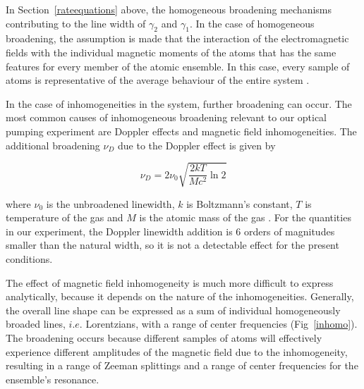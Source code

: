 In Section~\ref{rateequations} above, the homogeneous broadening
mechanisms contributing to the line width of $\gamma_2$ and
$\gamma_1$. In the case of homogeneous broadening, the assumption is
made that the interaction of the electromagnetic fields with the
individual magnetic moments of the atoms that has the same features
for every member of the atomic ensemble. In this case, every sample of
atoms is representative of the average behaviour of the entire system
\cite{vanier}. 

In the case of inhomogeneities in the system, further broadening can
occur. The most common causes of inhomogeneous broadening relevant to
our optical pumping experiment are Doppler effects and magnetic field
inhomogeneities. The additional broadening $\nu_D$ due to the Doppler effect
is given by

\begin{equation}
\nu_D = 2\nu_0\sqrt{\frac{2 k T}{M c^2}\ln{2}}
\end{equation}

where $\nu_0$ is the unbroadened linewidth, $k$ is Boltzmann's
constant, $T$ is temperature of the gas and $M$ is the atomic mass of
the gas \cite{yariv}. For the quantities in our experiment, the
Doppler linewidth addition is $6$ orders of magnitudes smaller than
the natural width, so it is not a detectable effect for the present
conditions.

The effect of magnetic field inhomogeneity is much more difficult to
express analytically, because it depends on the nature of the
inhomogeneities. Generally, the overall line shape can be expressed as
a sum of individual homogeneously broaded lines, $i.e.$ Lorentzians,
with a range of center frequencies
(Fig~\ref{inhomo})\cite{vanier}. The broadening occurs because
different samples of atoms will effectively experience different
amplitudes of the magnetic field due to the inhomogeneity,
resulting in a range of Zeeman splittings and a range of center
frequencies for the ensemble's resonance.

